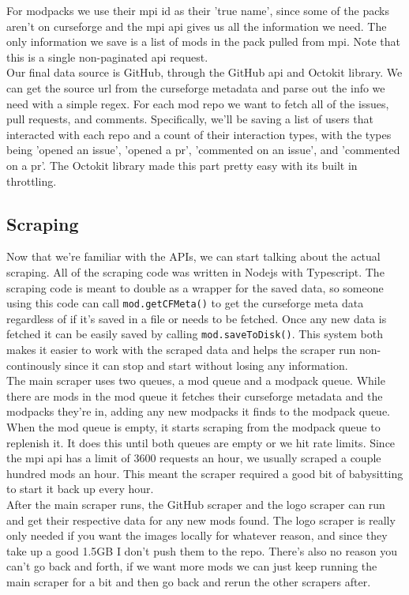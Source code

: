 \documentclass[a4paper,11pt, twocolumn]{article}
\begin{document}
For modpacks we use their mpi id as their 'true name', since some of the packs aren't on curseforge and the mpi api gives us all the information we need. The only information we save is a list of mods in the pack pulled from mpi. Note that this is a single non-paginated api request.\\

Our final data source is GitHub, through the GitHub api and Octokit library. We can get the source url from the curseforge metadata and parse out the info we need with a simple regex. For each mod repo we want to fetch all of the issues, pull requests, and comments. Specifically, we'll be saving a list of users that interacted with each repo and a count of their interaction types, with the types being 'opened an issue', 'opened a pr', 'commented on an issue', and 'commented on a pr'. The Octokit library made this part pretty easy with its built in throttling.

\subsection{Scraping}

Now that we're familiar with the APIs, we can start talking about the actual scraping. All of the scraping code was written in Nodejs with Typescript. The scraping code is meant to double as a wrapper for the saved data, so someone using this code can call \verb|mod.getCFMeta()| to get the curseforge meta data regardless of if it's saved in a file or needs to be fetched. Once any new data is fetched it can be easily saved by calling \verb|mod.saveToDisk()|. This system both makes it easier to work with the scraped data and helps the scraper run non-continously since it can stop and start without losing any information.\\

The main scraper uses two queues, a mod queue and a modpack queue. While there are mods in the mod queue it fetches their curseforge metadata and the modpacks they're in, adding any new modpacks it finds to the modpack queue. When the mod queue is empty, it starts scraping from the modpack queue to replenish it. It does this until both queues are empty or we hit rate limits. Since the mpi api has a limit of 3600 requests an hour, we usually scraped a couple hundred mods an hour. This meant the scraper required a good bit of babysitting to start it back up every hour.\\

After the main scraper runs, the GitHub scraper and the logo scraper can run and get their respective data for any new mods found. The logo scraper is really only needed if you want the images locally for whatever reason, and since they take up a good 1.5GB I don't push them to the repo. There's also no reason you can't go back and forth, if we want more mods we can just keep running the main scraper for a bit and then go back and rerun the other scrapers after.
\end{document}
